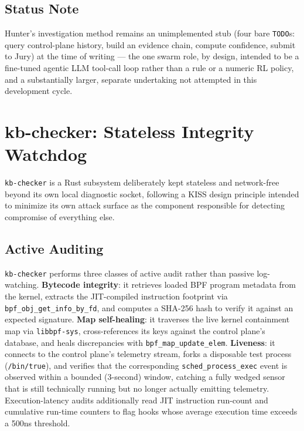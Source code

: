 \documentclass{article}
\begin{document}
\subsection{Status Note}

Hunter's investigation method remains an unimplemented stub (four bare
\texttt{TODO}s: query control-plane history, build an evidence chain,
compute confidence, submit to Jury) at the time of writing --- the one
swarm role, by design, intended to be a fine-tuned agentic LLM tool-call
loop rather than a rule or a numeric RL policy, and a substantially
larger, separate undertaking not attempted in this development cycle.

\section{kb-checker: Stateless Integrity Watchdog}
\label{sec:checker}

\texttt{kb-checker} is a Rust subsystem deliberately kept stateless and
network-free beyond its own local diagnostic socket, following a KISS
design principle intended to minimize its own attack surface as the
component responsible for detecting compromise of everything else.

\subsection{Active Auditing}

\texttt{kb-checker} performs three classes of active audit rather than
passive log-watching. \textbf{Bytecode integrity}: it retrieves loaded
BPF program metadata from the kernel, extracts the JIT-compiled
instruction footprint via \texttt{bpf\_obj\_get\_info\_by\_fd}, and
computes a SHA-256 hash to verify it against an expected signature.
\textbf{Map self-healing}: it traverses the live kernel containment map
via \texttt{libbpf-sys}, cross-references its keys against the control
plane's database, and heals discrepancies with
\texttt{bpf\_map\_update\_elem}. \textbf{Liveness}: it connects to the
control plane's telemetry stream, forks a disposable test process
(\texttt{/bin/true}), and verifies that the corresponding
\texttt{sched\_process\_exec} event is observed within a bounded
(3-second) window, catching a fully wedged sensor that is still
technically running but no longer actually emitting telemetry.
Execution-latency audits additionally read JIT instruction run-count
and cumulative run-time counters to flag hooks whose average execution
time exceeds a 500ns threshold.
\end{document}
